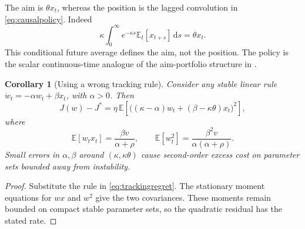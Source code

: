 \documentclass[11pt]{article}
\theoremstyle{plain}
\newtheorem{corollary}[theorem]{Corollary}
\theoremstyle{definition}
\theoremstyle{remark}
\newcommand{\E}{\mathbb E}
\newcommand{\dd}{\,\mathrm d}
\begin{document}
The aim is \(\theta x_t\), whereas the position is the lagged
convolution in \eqref{eq:causalpolicy}. Indeed
\[
\kappa\int_0^\infty e^{-\kappa s}\E_t[x_{t+s}]\dd s=\theta x_t.
\]
This conditional future average defines the aim, not the position.
The policy is the scalar continuous-time analogue of the aim-portfolio
structure in \citet{GarleanuPedersen2013}.

\begin{corollary}[Using a wrong tracking rule]\label{cor:wrongtracking}
Consider any stable linear rule
\(\dot w_t=-\alpha w_t+\beta x_t\), with \(\alpha>0\).
Then
\[
J(w)-J^\ast=
\eta\,\E\!\left[\big((\kappa-\alpha)w_t+
                 (\beta-\kappa\theta)x_t\big)^2\right],
\]
where
\[
\E[w_tx_t]=\frac{\beta v}{\alpha+\rho},\qquad
\E[w_t^2]=\frac{\beta^2v}{\alpha(\alpha+\rho)}.
\]
Small errors in \(\alpha,\beta\) around
\((\kappa,\kappa\theta)\) cause second-order excess cost on parameter
sets bounded away from instability.
\end{corollary}
\begin{proof}
Substitute the rule in \eqref{eq:trackingregret}. The stationary moment
equations for \(wx\) and \(w^2\) give the two covariances. These moments
remain bounded on compact stable parameter sets, so the quadratic
residual has the stated rate.
\end{proof}
\end{document}

